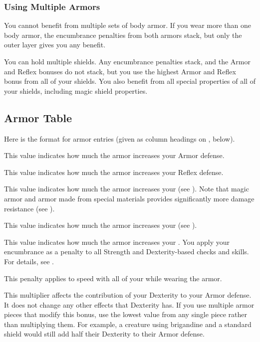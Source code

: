     \subsubsection{Using Multiple Armors}
      You cannot benefit from multiple sets of body armor.
      If you wear more than one body armor, the encumbrance penalties from both armors stack, but only the outer layer gives you any benefit.

      You can hold multiple shields.
      Any encumbrance penalties stack, and the Armor and Reflex bonuses do not stack, but you use the highest Armor and Reflex bonus from all of your shields.
      You also benefit from all special properties of all of your shields, including magic shield properties.

  \subsection{Armor Table}
    \par Here is the format for armor entries (given as column headings on , below).

     This value indicates how much the armor increases your Armor defense.

     This value indicates how much the armor increases your Reflex defense.

     This value indicates how much the armor increases your  (see ).
    Note that magic armor and armor made from special materials provides significantly more damage resistance (see ).

     This value indicates how much the armor increases your  (see ).

     This value indicates how much the armor increases your .
    You apply your encumbrance as a penalty to all Strength and Dexterity-based checks and skills.
    For details, see .

     This penalty applies to speed with all of your  while wearing the armor.

     This multiplier affects the contribution of your Dexterity to your Armor defense.
    It does not change any other effects that Dexterity has.
    If you use multiple armor pieces that modify this bonus, use the lowest value from any single piece rather than multiplying them.
    For example, a creature using brigandine and a standard shield would still add half their Dexterity to their Armor defense.

